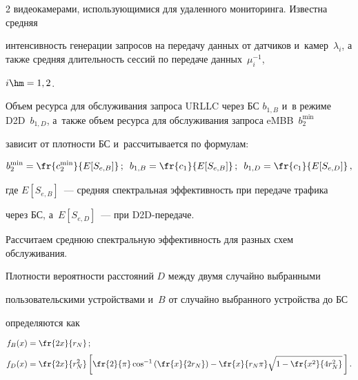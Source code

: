 \begin{multicols}{2}
видеокамерами, использующимися для удаленного мониторинга. Известна средняя 


интенсивность генерации запросов на передачу данных от датчиков и~камер~$\lambda_i$, а также средняя длительность сессий по передаче данных~$\mu_i^{-1}$, 


$i \hm= 1,2$.


Объем ресурса для обслуживания запроса URLLC через БС $b_{1,B}$ и~в режиме D2D~$b_{1,D}$, а~также объем ресурса для обслуживания запроса \mbox{eMBB}~$b_2^{\min}$ 


зависит от плотности БС и~рассчитывается по формулам:


\begin{equation*}


b_2^{\min}=\fr{c_2^{\min}}{E[S_{e,B}]}\,;\enskip b_{1,B} =\fr{c_1}{E[S_{e,B}]}\,;\enskip


  b_{1,D}=\fr{c_1}{E[S_{e,D}]}\,,




\end{equation*}





\noindent


где $E[S_{e,B}]$~--- средняя спектральная эффективность при передаче трафика 


через БС, а~$E[S_{e,D}]$~--- при D2D-передаче.





Рассчитаем среднюю спектральную эффективность для разных схем обслуживания. 


Плотности вероятности расстояний $D$ между двумя случайно выбранными 


пользовательскими устройствами и~$B$ от случайно выбранного устройства до БС 


определяются как~\cite{moltchanov2012distance}


\begin{align*}


f_{B}(x)&=\fr{2x}{r_N}\,;\\[3pt]


f_{D}(x)&=\fr{2x}{r_N^2}\left[\fr{2}{\pi}\cos^{-1}\left(\fr{x}{2r_N}\right)-\fr{x}{r_N\pi}\sqrt{1-\fr{x^2}{4r_N^2}}\,\right].




\end{align*}






\end{multicols}
